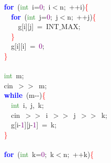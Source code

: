 {{\mbox{}\ \ \ \ \textbf{\textcolor{Blue}{for}}\ \textcolor{BrickRed}{(}\textcolor{ForestGreen}{int}\ i\textcolor{BrickRed}{=}\textcolor{Purple}{0}\textcolor{BrickRed}{;}\ i\textcolor{BrickRed}{$<$}n\textcolor{BrickRed}{;}\ \textcolor{BrickRed}{++}i\textcolor{BrickRed}{)}\textcolor{Red}{\{} \\
\mbox{}\ \ \ \ \ \ \textbf{\textcolor{Blue}{for}}\ \textcolor{BrickRed}{(}\textcolor{ForestGreen}{int}\ j\textcolor{BrickRed}{=}\textcolor{Purple}{0}\textcolor{BrickRed}{;}\ j\textcolor{BrickRed}{$<$}n\textcolor{BrickRed}{;}\ \textcolor{BrickRed}{++}j\textcolor{BrickRed}{)}\textcolor{Red}{\{} \\
\mbox{}\ \ \ \ \ \ \ \ g\textcolor{BrickRed}{[}i\textcolor{BrickRed}{][}j\textcolor{BrickRed}{]}\ \textcolor{BrickRed}{=}\ INT$\_$MAX\textcolor{BrickRed}{;} \\
\mbox{}\ \ \ \ \ \ \textcolor{Red}{\}} \\
\mbox{}\ \ \ \ \ \ g\textcolor{BrickRed}{[}i\textcolor{BrickRed}{][}i\textcolor{BrickRed}{]}\ \textcolor{BrickRed}{=}\ \textcolor{Purple}{0}\textcolor{BrickRed}{;} \\
\mbox{}\ \ \ \ \textcolor{Red}{\}} \\
\mbox{} \\
\mbox{}\ \ \ \ \textcolor{ForestGreen}{int}\ m\textcolor{BrickRed}{;} \\
\mbox{}\ \ \ \ cin\ \textcolor{BrickRed}{$>$$>$}\ m\textcolor{BrickRed}{;} \\
\mbox{}\ \ \ \ \textbf{\textcolor{Blue}{while}}\ \textcolor{BrickRed}{(}m\textcolor{BrickRed}{-\/-)}\textcolor{Red}{\{} \\
\mbox{}\ \ \ \ \ \ \textcolor{ForestGreen}{int}\ i\textcolor{BrickRed}{,}\ j\textcolor{BrickRed}{,}\ k\textcolor{BrickRed}{;} \\
\mbox{}\ \ \ \ \ \ cin\ \textcolor{BrickRed}{$>$$>$}\ i\ \textcolor{BrickRed}{$>$$>$}\ j\ \textcolor{BrickRed}{$>$$>$}\ k\textcolor{BrickRed}{;} \\
\mbox{}\ \ \ \ \ \ g\textcolor{BrickRed}{[}i\textcolor{BrickRed}{-}\textcolor{Purple}{1}\textcolor{BrickRed}{][}j\textcolor{BrickRed}{-}\textcolor{Purple}{1}\textcolor{BrickRed}{]}\ \textcolor{BrickRed}{=}\ k\textcolor{BrickRed}{;} \\
\mbox{}\ \ \ \ \textcolor{Red}{\}} \\
\mbox{} \\
\mbox{}\ \ \ \ \textbf{\textcolor{Blue}{for}}\ \textcolor{BrickRed}{(}\textcolor{ForestGreen}{int}\ k\textcolor{BrickRed}{=}\textcolor{Purple}{0}\textcolor{BrickRed}{;}\ k\textcolor{BrickRed}{$<$}n\textcolor{BrickRed}{;}\ \textcolor{BrickRed}{++}k\textcolor{BrickRed}{)}\textcolor{Red}{\{} \\
}}
